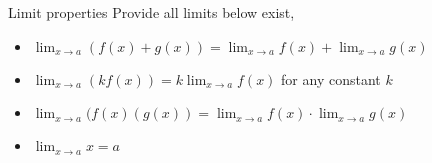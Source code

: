\documentclass[11pt]{beamer}
\newcommand{\di}{\displaystyle}
\begin{document}
\begin{frame}{Limit properties}
Provide all limits below exist,
\begin{itemize}
\item $\di \lim_{x\to a}(f(x)+g(x)) = \lim_{x\to a}f(x)+\lim_{x\to a}g(x)$
\item $\di \lim_{x\to a}(kf(x)) = k\lim_{x\to a}f(x)$ \quad for any constant $k$
\item $\di \lim_{x\to a}(f(x)(g(x)) = \lim_{x\to a}f(x)\cdot \lim_{x\to a}g(x)$
\item $\di \lim_{x\to a}x = a$
\end{itemize}
\end{frame}
\end{document}
